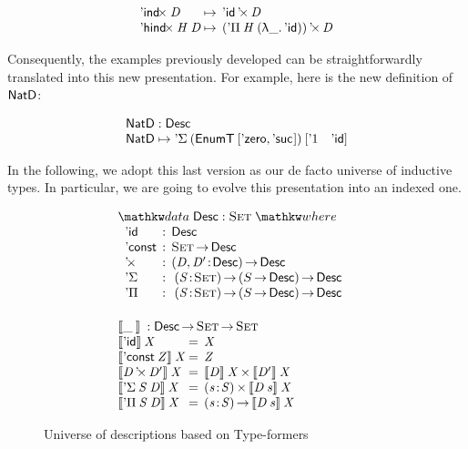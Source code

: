\[\begin{array}{l@{\:\mapsto\:\:}l}
\DIndx{\V{D}}         & \DProd{\DId}{\V{D}}                      \\
\DHindx{\V{H}}{\V{D}}     & \DProd{(\DPi{\V{H}}{(\LAM{\_} \DId)})}{\V{D}}
\end{array}
\]

Consequently, the examples previously developed can be
straightforwardly translated into this new presentation. For example,
here is the new definition of $\NatD$:

\[\stk{
\NatD : \Desc \\
\NatD \mapsto \DSigma{(\EnumT{[ \NatZero, \NatSuc{\!} ]})}
                     {[ \DUnit \quad \DId ]}
}\]


In the following, we adopt this last version as our de
facto universe of inductive types. In particular, we are going to
evolve this presentation into an indexed one.


\begin{figure}

\[\stk{
\begin{array}{ll}
\stk{
\data \Desc : \Set \where                                      \\
\;\;\begin{array}{@{}l@{\::\:\:}l@{\quad}l}
    \DId            & \Desc                                    \\
    \DConst{}       & \Set \To \Desc                           \\
    \DProd{}{}      & \PI{\V{D}, \V{D'}}{\Desc} \Desc          \\
    \DSigma         & \PI{\V{S}}{\Set} \PIS{S \To \Desc} \Desc \\
    \DPi            & \PI{\V{S}}{\Set} \PIS{S \To \Desc} \Desc 
\end{array}
}
\vspace{0.2in}
\\
\stk{
\descop{\_\:}{} : \Desc \To \Set \To \Set \\
\begin{array}{@{}l@{\:=\:\:}ll}
\descop{\DId}{\V{X}}          &  \V{X}                                           \\
\descop{\DConst{\V{Z}}}{\V{X}}    &  \V{Z}                                           \\
\descop{\DProd{\V{D}}{\V{D'}}}{\V{X}} &  \TIMES{\descop{\V{D}}{\V{X}}}{\descop{\V{D}\V{'}}{\V{X}}}       \\
\descop{\DSigma{\V{S}}{\V{D}}}{\V{X}} &  \SIGMA{\V{s}}{\V{S}} \descop{\V{D}\: \V{s}}{\V{X}}          \\
\descop{\DPi{\V{S}}{\V{D}}}{\V{X}}    &  \PI{\V{s}}{\V{S}} \descop{\V{D}\: \V{s}}{\V{X}}            
\end{array}
}
\end{array}
}\]

\caption{Universe of descriptions based on Type-formers}
\label{fig:type-former-desc}

\end{figure}

